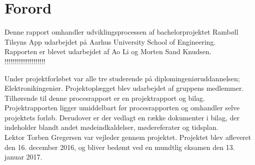 \chapter*{Forord}
Denne rapport omhandler udviklingsprocessen af bachelorprojektet Rambøll Tilsyns App udarbejdet på Aarhus University School of Engineering. \\
Rapporten er blevet udarbejdet af Ao Li og Morten Sand Knudsen. \\ 

!!!!!!!!!!!!!!!!!!!!!

Under projektforløbet var alle tre studerende på diplomingeniøruddannelsen; Elektronikingeniør.
Projektoplægget blev udarbejdet af gruppens medlemmer.
Tilhørende til denne procesrapport er en projektrapport og bilag. Projektrapporten ligger
umiddelbart før procesrapporten og omhandler selve projektets forløb. Derudover er der
vedlagt en række dokumenter i bilag, der indeholder blandt andet mødeindkaldelser,
mødereferater og tidsplan. \\
Lektor Torben Gregersen var vejleder gennem projektet. Projektet blev afleveret den 16.
december 2016, og bliver bedømt ved en mundtlig eksamen den 13. januar 2017.
